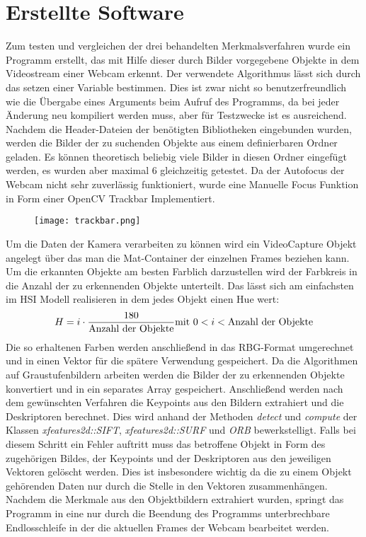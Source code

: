 \section{Erstellte Software}
Zum testen und vergleichen der drei behandelten Merkmalsverfahren wurde ein Programm erstellt, das mit Hilfe dieser durch Bilder vorgegebene Objekte in dem Videostream einer Webcam erkennt.
Der verwendete Algorithmus lässt sich durch das setzen einer Variable bestimmen. Dies ist zwar nicht so benutzerfreundlich wie die Übergabe eines Arguments beim Aufruf des Programms, da bei jeder Änderung neu kompiliert werden muss, aber für Testzwecke ist es ausreichend.
Nachdem die Header-Dateien der benötigten Bibliotheken eingebunden wurden, werden die Bilder der zu suchenden Objekte aus einem definierbaren Ordner geladen. Es können theoretisch beliebig viele Bilder in diesen Ordner eingefügt werden, es wurden aber maximal 6 gleichzeitig getestet.
Da der Autofocus der Webcam nicht sehr zuverlässig funktioniert, wurde eine Manuelle Focus Funktion in Form einer OpenCV Trackbar Implementiert. 
\begin{figure}[h]
\texttt{[image: trackbar.png]}
\centering
\end{figure}
Um die Daten der Kamera verarbeiten zu können wird ein VideoCapture Objekt angelegt über das man die Mat-Container der einzelnen Frames beziehen kann.
Um die erkannten Objekte am besten Farblich darzustellen wird der Farbkreis in die Anzahl der zu erkennenden Objekte unterteilt. Das lässt sich am einfachsten im HSI Modell realisieren in dem jedes Objekt einen Hue wert:
\begin{equation}
H = i \cdot \dfrac{180}{\text{Anzahl der Objekte}} \\
\text{mit } 0 < i < \text{Anzahl der Objekte}
\end{equation}
Die so erhaltenen Farben werden anschließend in das RBG-Format umgerechnet und in einen Vektor für die spätere Verwendung gespeichert.
Da die Algorithmen auf Graustufenbildern arbeiten werden die Bilder der zu erkennenden Objekte konvertiert und in ein separates Array gespeichert.
Anschließend werden nach dem gewünschten Verfahren die Keypoints aus den Bildern extrahiert und die Deskriptoren berechnet.
Dies wird anhand der Methoden \emph{detect} und \emph{compute} der Klassen \emph{xfeatures2d::SIFT}, \emph{xfeatures2d::SURF} und \emph{ORB} bewerkstelligt. 
Falls bei diesem Schritt ein Fehler auftritt muss das betroffene Objekt in Form des zugehörigen Bildes, der Keypoints und der Deskriptoren aus den jeweiligen Vektoren gelöscht werden.
Dies ist insbesondere wichtig da die zu einem Objekt gehörenden Daten nur durch die Stelle in den Vektoren zusammenhängen.
Nachdem die Merkmale aus den Objektbildern extrahiert wurden, springt das Programm in eine nur durch die Beendung des Programms unterbrechbare Endlosschleife in der die aktuellen Frames der Webcam bearbeitet werden.
